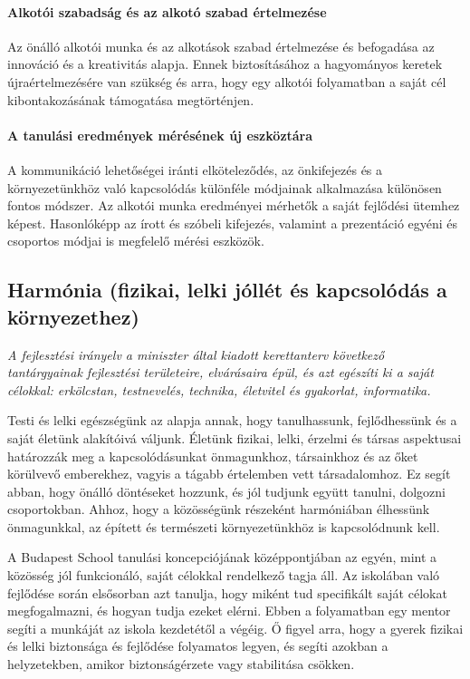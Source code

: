 \paragraph{Alkotói szabadság és az alkotó szabad értelmezése}

Az önálló alkotói munka és az alkotások szabad értelmezése és befogadása az innováció és a kreativitás alapja. Ennek biztosításához a hagyományos keretek újraértelmezésére van szükség és arra, hogy egy alkotói folyamatban a saját cél kibontakozásának támogatása megtörténjen.

\paragraph{A tanulási eredmények mérésének új eszköztára}

A kommunikáció lehetőségei iránti elköteleződés, az önkifejezés és a környezetünkhöz való kapcsolódás különféle módjainak alkalmazása különösen fontos módszer. Az alkotói munka eredményei mérhetők a saját fejlődési ütemhez képest. Hasonlóképp az írott és szóbeli kifejezés, valamint a prezentáció egyéni és csoportos módjai is megfelelő mérési eszközök.

\subsection[Harmónia]{Harmónia (fizikai, lelki jóllét és kapcsolódás a környezethez)}
\emph{A fejlesztési irányelv a miniszter által kiadott kerettanterv következő tantárgyainak fejlesztési területeire, elvárásaira épül, és azt egészíti ki a saját célokkal: erkölcstan, testnevelés, technika, életvitel és gyakorlat, informatika.}

Testi és lelki egészségünk az alapja annak, hogy tanulhassunk, fejlődhessünk és a saját életünk alakítóivá váljunk. Életünk fizikai, lelki, érzelmi és társas aspektusai határozzák meg a kapcsolódásunkat önmagunkhoz, társainkhoz és az őket körülvevő emberekhez, vagyis a tágabb értelemben vett társadalomhoz. Ez segít abban, hogy önálló döntéseket hozzunk, és jól tudjunk együtt tanulni, dolgozni csoportokban. Ahhoz, hogy a közösségünk részeként harmóniában élhessünk önmagunkkal, az épített és természeti környezetünkhöz is kapcsolódnunk kell.

A Budapest School tanulási koncepciójának középpontjában az egyén, mint a közösség jól funkcionáló, saját célokkal rendelkező tagja áll. Az iskolában való fejlődése során elsősorban azt tanulja, hogy miként tud specifikált saját célokat megfogalmazni, és hogyan tudja ezeket elérni. Ebben a folyamatban egy mentor segíti a munkáját az iskola kezdetétől a végéig. Ő figyel arra, hogy a gyerek fizikai és lelki biztonsága és fejlődése folyamatos legyen, és segíti azokban a helyzetekben, amikor biztonságérzete vagy stabilitása csökken.

